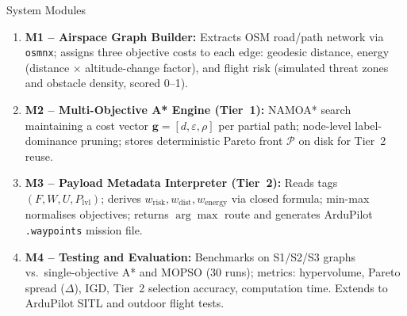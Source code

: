 \documentclass[aspectratio=169,11pt]{beamer}
\begin{document}
\begin{frame}{System Modules}
  \begin{enumerate}
    \item \textbf{M1 -- Airspace Graph Builder:}
          Extracts OSM road/path network via \texttt{osmnx}; assigns three
          objective costs to each edge: geodesic distance, energy
          (distance $\times$ altitude-change factor), and flight risk
          (simulated threat zones and obstacle density, scored 0--1).

    \item \textbf{M2 -- Multi-Objective A* Engine (Tier~1):}
          NAMOA* search maintaining a cost vector $\mathbf{g}=[d,\varepsilon,\rho]$
          per partial path; node-level label-dominance pruning; stores
          deterministic Pareto front $\mathcal{P}$ on disk for Tier~2 reuse.

    \item \textbf{M3 -- Payload Metadata Interpreter (Tier~2):}
          Reads tags $(F,W,U,P_\mathrm{lvl})$; derives $w_\mathrm{risk},
          w_\mathrm{dist},w_\mathrm{energy}$ via closed formula; min-max
          normalises objectives; returns $\arg\max$ route and generates
          ArduPilot \texttt{.waypoints} mission file.

    \item \textbf{M4 -- Testing and Evaluation:}
          Benchmarks on S1/S2/S3 graphs vs.\ single-objective A* and MOPSO
          (30 runs); metrics: hypervolume, Pareto spread ($\Delta$), IGD,
          Tier~2 selection accuracy, computation time.  Extends to ArduPilot
          SITL and outdoor flight tests.
  \end{enumerate}
\end{frame}
\end{document}
